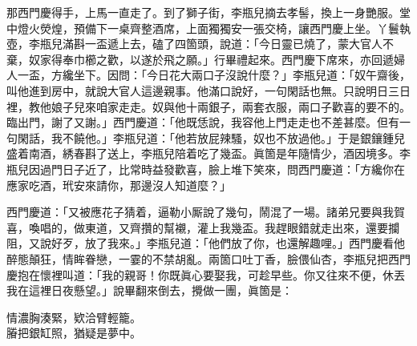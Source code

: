 那西門慶得手，上馬一直走了。到了獅子街，李瓶兒摘去孝髻，換上一身艷服。堂中燈火熒煌，預備下一桌齊整酒席，{}上面獨獨安一張交椅，讓西門慶上坐。丫鬟執壺，李瓶兒滿斟一盃遞上去，磕了四箇頭，說道：「今日靈已燒了，蒙大官人不棄，奴家得奉巾櫛之歡，以遂於飛之願。」行畢禮起來。西門慶下席來，亦回遞婦人一盃，方纔坐下。因問：「今日花大兩口子沒說什麼？」{}李瓶兒道：「奴午齋後，叫他進到房中，就說大官人這邊親事。他滿口說好，一句閑話也無。只說明日三日裡，教他娘子兒來咱家走走。奴與他十兩銀子，兩套衣服，兩口子歡喜的要不的。臨出門，謝了又謝。」西門慶道：「他既恁說，我容他上門走走也不差甚麼。但有一句閑話，我不饒他。」{}李瓶兒道：「他若放屁辣騷，奴也不放過他。」于是銀鑲鍾兒盛着南酒，綉春斟了送上，李瓶兒陪着吃了幾盃。眞箇是年隨情少，酒因境多。李瓶兒因過門日子近了，比常時益發歡喜，臉上堆下笑來，問西門慶道：「方纔你在應家吃酒，玳安來請你，那邊沒人知道麼？」

西門慶道：「又被應花子猜着，逼勒小厮說了幾句，鬧混了一場。諸弟兄要與我賀喜，喚唱的，做東道，又齊攢的幫襯，灌上我幾盃。我趕眼錯就走出來，還要攔阻，又說好歹，放了我來。」{}李瓶兒道：「他們放了你，也還解趣哩。」西門慶看他醉態顛狂，情眸眷戀，一霎的不禁胡亂。兩箇口吐丁香，臉偎仙杏，李瓶兒把西門慶抱在懷裡叫道：「我的親哥！你既眞心要娶我，可趁早些。{}你又往來不便，休丟我在這裡日夜懸望。」說畢翻來倒去，攪做一團，眞箇是：

\begin{myquote}
情濃胸湊緊，欵洽臂輕籠。\\膡把銀缸照，猶疑是夢中。
\end{myquote}

 

